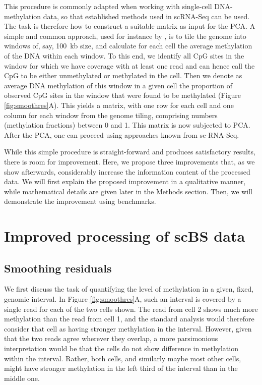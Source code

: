 \documentclass[twocolumn,10pt]{article}
\begin{document}
This procedure is commonly adapted when working with single-cell DNA-methylation data, so that established methods used in scRNA-Seq can be used.
The task is therefore how to construct a suitable matrix as input for the PCA. A simple and common approach, used for instance by \citet{luo2017single}, is to tile the genome into windows of, say, 100~kb size, and calculate for each cell the average methylation of the DNA within each window. To this end, we identify all CpG sites in the window for which we have coverage with at least one read and can hence call the CpG to be either unmethylated or methylated in the cell. Then we denote as average DNA methylation of this window in a given cell the proportion of observed CpG sites in the window that were found to be methylated (Figure \ref{fig:smoothres}A). This yields a matrix, with one row for each cell and one column for each window from the genome tiling, comprising numbers (methylation fractions) between 0 and 1. This matrix is now subjected to PCA. After the PCA, one can proceed using approaches known from sc-RNA-Seq.

While this simple procedure is straight-forward and produces satisfactory results, there is room for improvement. Here, we propose three improvements that, as we show afterwards, considerably increase the information content of the processed data. We will first explain the proposed improvement in a qualitative manner, while mathematical details are given later in the Methods section. Then, we will demonstrate the improvement using benchmarks.

\section{Improved processing of scBS data}

\subsection{Smoothing residuals} \label{residuals}

We first discuss the task of quantifying the level of methylation in a given, fixed, genomic interval. In Figure \ref{fig:smoothres}A, such an interval is covered by a single read for each of the two cells shown. The read from cell 2 shows much more methylation than the read from cell 1, and the standard analysis would therefore consider that cell as having stronger methylation in the interval. However, given that the two reads agree wherever they overlap, a more parsimonious interpretation would be that the cells do not show difference in methylation within the interval. Rather, both cells, and similarly maybe most other cells, might have stronger methylation in the left third of the interval than in the middle one.
\end{document}
